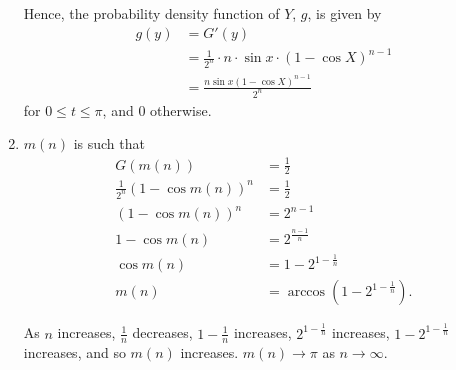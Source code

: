 \begin{enumerate}
          Hence, the probability density function of \(Y\), \(g\), is given by
          \begin{align*}
              g(y) & = G'(y)                                                                    \\
                   & = \frac{1}{2^n} \cdot n \cdot \sin x \cdot \left(1 - \cos X\right)^{n - 1} \\
                   & = \frac{n \sin x \left(1 - \cos X\right)^{n - 1}}{2^n}
          \end{align*}
          for \(0 \leq t \leq \pi\), and \(0\) otherwise.

    \item \(m(n)\) is such that
          \begin{align*}
              G(m(n))                                    & = \frac{1}{2}                                   \\
              \frac{1}{2^n} \left(1 - \cos m(n)\right)^n & = \frac{1}{2}                                   \\
              \left(1 - \cos m(n)\right)^n               & = 2^{n - 1}                                     \\
              1 - \cos m(n)                              & = 2^{\frac{n - 1}{n}}                           \\
              \cos m(n)                                  & = 1 - 2^{1 - \frac{1}{n}}                       \\
              m(n)                                       & = \arccos \left(1 - 2^{1 - \frac{1}{n}}\right).
          \end{align*}

          As \(n\) increases, \(\frac{1}{n}\) decreases, \(1 - \frac{1}{n}\) increases, \(2^{1 - \frac{1}{n}}\) increases, \(1 - 2^{1 - \frac{1}{n}}\) increases, and so \(m(n)\) increases. \(m(n) \to \pi\) as \(n \to \infty\).


\end{enumerate}
